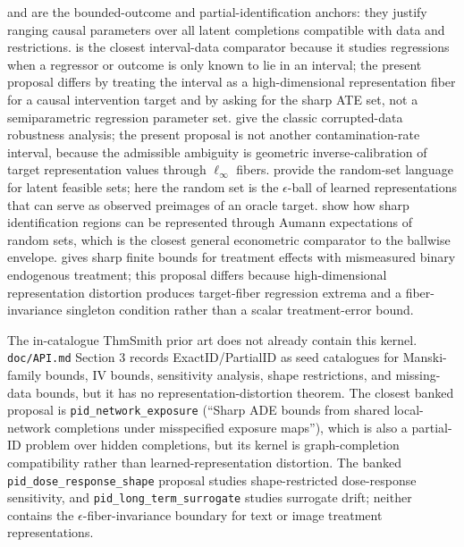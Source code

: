 \documentclass[11pt]{article}
\theoremstyle{definition}
\theoremstyle{plain}
\theoremstyle{remark}
\begin{document}
\citet{Manski1990} and \citet{Manski2003} are the bounded-outcome and partial-identification anchors: they justify ranging causal parameters over all latent completions compatible with data and restrictions.  \citet{ManskiTamer2002} is the closest interval-data comparator because it studies regressions when a regressor or outcome is only known to lie in an interval; the present proposal differs by treating the interval as a high-dimensional representation fiber for a causal intervention target and by asking for the sharp ATE set, not a semiparametric regression parameter set.  \citet{HorowitzManski1995} give the classic corrupted-data robustness analysis; the present proposal is not another contamination-rate interval, because the admissible ambiguity is geometric inverse-calibration of target representation values through \(\ell_\infty\) fibers.  \citet{BeresteanuMolchanovMolinari2012} provide the random-set language for latent feasible sets; here the random set is the \(\epsilon\)-ball of learned representations that can serve as observed preimages of an oracle target.  \citet{BeresteanuMolchanovMolinari2011} show how sharp identification regions can be represented through Aumann expectations of random sets, which is the closest general econometric comparator to the ballwise envelope.  \citet{Ura2018} gives sharp finite bounds for treatment effects with mismeasured binary endogenous treatment; this proposal differs because high-dimensional representation distortion produces target-fiber regression extrema and a fiber-invariance singleton condition rather than a scalar treatment-error bound.

The in-catalogue ThmSmith prior art does not already contain this kernel.  \texttt{doc/API.md} Section 3 records ExactID/PartialID as seed catalogues for Manski-family bounds, IV bounds, sensitivity analysis, shape restrictions, and missing-data bounds, but it has no representation-distortion theorem.  The closest banked proposal is \texttt{pid\_network\_exposure} (``Sharp ADE bounds from shared local-network completions under misspecified exposure maps''), which is also a partial-ID problem over hidden completions, but its kernel is graph-completion compatibility rather than learned-representation distortion.  The banked \texttt{pid\_dose\_response\_shape} proposal studies shape-restricted dose-response sensitivity, and \texttt{pid\_long\_term\_surrogate} studies surrogate drift; neither contains the \(\epsilon\)-fiber-invariance boundary for text or image treatment representations.
\end{document}
